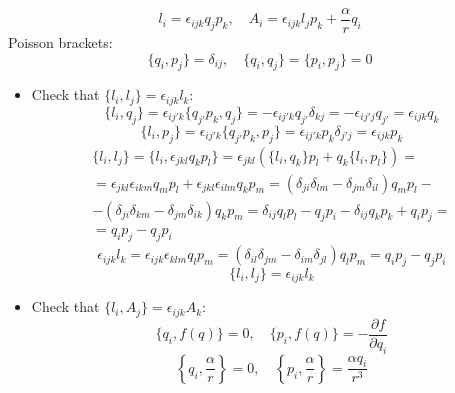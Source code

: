 \documentclass[12pt]{article}
\theoremstyle{definition}
\begin{document}
\begin{enumerate}
\begin{itemize}
        \begin{equation}
            l_i=\epsilon_{ijk}q_jp_k,\quad A_i=\epsilon_{ijk}l_jp_k+\frac{\alpha}{r}q_i
        \end{equation}
        Poisson brackets:
        \begin{equation}
            \{q_i,p_j\}=\delta_{ij},\quad\{q_i,q_j\}=\{p_i,p_j\}=0
        \end{equation}
        \begin{itemize}
            \item Check that $\{l_i,l_j\}=\epsilon_{ijk}l_k$:
            \begin{equation}
                \{l_i,q_j\}=\epsilon_{ij'k}\{q_{j'}p_k,q_j\}=-\epsilon_{ij'k}q_{j'}\delta_{kj}=-\epsilon_{ij'j}q_{j'}=\epsilon_{ijk}q_k
            \end{equation}
            \begin{equation}
                \{l_i,p_j\}=\epsilon_{ij'k}\{q_{j'}p_k,p_j\}=\epsilon_{ij'k}p_k\delta_{j'j}=\epsilon_{ijk}p_k
            \end{equation}
            \begin{multline}
                \{l_i,l_j\}=\{l_i,\epsilon_{jkl}q_kp_l\}=\epsilon_{jkl}(\{l_i,q_k\}p_l+q_k\{l_i,p_l\})=\\=\epsilon_{jkl}\epsilon_{ikm}q_mp_l+\epsilon_{jkl}\epsilon_{ilm}q_kp_m=(\delta_{ji}\delta_{lm}-\delta_{jm}\delta_{il})q_mp_l-\\-(\delta_{ji}\delta_{km}-\delta_{jm}\delta_{ik})q_kp_m=\delta_{ij}q_lp_l-q_jp_i-\delta_{ij}q_kp_k+q_ip_j=\\=q_ip_j-q_jp_i
            \end{multline}
            \begin{equation}
                \epsilon_{ijk}l_k=\epsilon_{ijk}\epsilon_{klm}q_lp_m=(\delta_{il}\delta_{jm}-\delta_{im}\delta_{jl})q_lp_m=q_ip_j-q_jp_i
            \end{equation}
            \begin{equation}
                \boxed{\{l_i,l_j\}=\epsilon_{ijk}l_k}
            \end{equation}
            \item Check that $\{l_i,A_j\}=\epsilon_{ijk}A_k$:
            \begin{equation}
                \{q_i,f(q)\}=0,\quad\{p_i,f(q)\}=-\frac{\partial f}{\partial q_i}
            \end{equation}
            \begin{equation}
                \left\{q_i,\frac{\alpha}{r}\right\}=0,\quad\left\{p_i,\frac{\alpha}{r}\right\}=\frac{\alpha q_i}{r^3}

\end{equation}
\end{itemize}
\end{itemize}
\end{enumerate}
\end{document}
